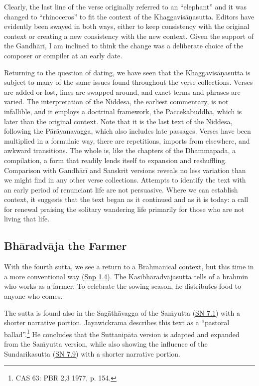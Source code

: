 \documentclass[12pt,openany]{book}%
\begin{document}
Clearly, the last line of the verse originally referred to an “elephant” and it was changed to “rhinoceros” to fit the context of the \textsanskrit{Khaggavisāṇasutta}. Editors have evidently been swayed in both ways, either to keep consistency with the original context or creating a new consistency with the new context. Given the support of the \textsanskrit{Gandhārī}, I am inclined to think the change was a deliberate choice of the composer or compiler at an early date.

Returning to the question of dating, we have seen that the \textsanskrit{Khaggavisāṇasutta} is subject to many of the same issues found throughout the verse collections. Verses are added or lost, lines are swapped around, and exact terms and phrases are varied. The interpretation of the Niddesa, the earliest commentary, is not infallible, and it employs a doctrinal framework, the Paccekabuddha, which is later than the original context. Note that it is the last text of the Niddesa, following the \textsanskrit{Pārāyanavagga}, which also includes late passages. Verses have been multiplied in a formulaic way, there are repetitions, imports from elsewhere, and awkward transitions. The whole is, like the chapters of the Dhammapada, a compilation, a form that readily lends itself to expansion and reshuffling. Comparison with \textsanskrit{Gandhārī} and Sanskrit versions reveals no less variation than we might find in any other verse collections. Attempts to identify the text with an early period of renunciant life are not persuasive. Where we can establish context, it suggests that the text began as it continued and as it is today: a call for renewal praising the solitary wandering life primarily for those who are not living that life.

\subsection*{\textsanskrit{Bhāradvāja} the Farmer}

With the fourth sutta, we see a return to a Brahmanical context, but this time in a more conventional way (\href{https://suttacentral.net/snp1.4/en/sujato}{Snp 1.4}). The \textsanskrit{Kasibhāradvājasutta} tells of a brahmin who works as a farmer. To celebrate the sowing season, he distributes food to anyone who comes.

The sutta is found also in the \textsanskrit{Sagāthāvagga} of the \textsanskrit{Saṁyutta} (\href{https://suttacentral.net/sn7.1}{SN 7.1}) with a shorter narrative portion. Jayawickrama describes this text as a “pastoral ballad”.\footnote{CAS 63: PBR 2,3 1977, p. 154. } He concludes that the \textsanskrit{Suttanipāta} version is adapted and expanded from the \textsanskrit{Saṁyutta} version, while also showing the influence of the Sundarikasutta (\href{https://suttacentral.net/sn7.9}{SN 7.9}) with a shorter narrative portion.
\end{document}
